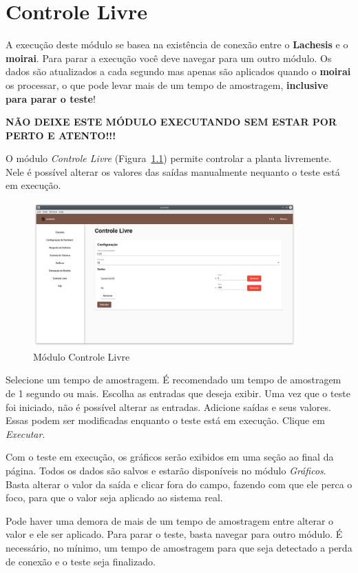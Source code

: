 
\chapter{Controle Livre}%
\label{chapter:free-control}

\begin{mdframed}[frametitle={Atenção!}]
    A execução deste módulo se basea na existência de conexão entre o
    \textbf{Lachesis} e o \textbf{moirai}. Para parar a execução você deve
    navegar para um outro módulo. Os dados são atualizados a cada segundo mas
    apenas são aplicados quando o \textbf{moirai} os processar, o que pode levar
    mais de um tempo de amostragem, \textbf{inclusive para parar o teste}!

    \textbf{NÃO DEIXE ESTE MÓDULO EXECUTANDO SEM ESTAR POR PERTO E ATENTO!!!}
\end{mdframed}

O módulo \textit{Controle Livre} (Figura~\ref{fig:free-control}) permite
controlar a planta livremente. Nele é possível alterar os valores das saídas
manualmente nequanto o teste está em execução.

\begin{figure}[ht!]
    \centering
    \includegraphics[width=0.9\textwidth]{imgs/free-control}
    \caption[Módulo Controle Livre]{Módulo Controle Livre}%
    \label{fig:free-control}
\end{figure}

Selecione um tempo de amostragem. É recomendado um tempo de amostragem de 1
segundo ou mais. Escolha as entradas que deseja exibir. Uma vez que o teste foi
iniciado, não é possível alterar as entradas. Adicione saídas e seus valores.
Essas podem ser modificadas enquanto o teste está em execução. Clique em
\textit{Executar}.

Com o teste em execução, os gráficos serão exibidos em uma seção ao final da
página. Todos os dados são salvos e estarão disponíveis no módulo
\textit{Gráficos}. Basta alterar o valor da saída e clicar fora do campo,
fazendo com que ele perca o foco, para que o valor seja aplicado ao sistema
real.

Pode haver uma demora de mais de um tempo de amostragem entre alterar o valor e
ele ser aplicado. Para parar o teste, basta navegar para outro módulo. É
necessário, no mínimo, um tempo de amostragem para que seja detectado a perda de
conexão e o teste seja finalizado.
